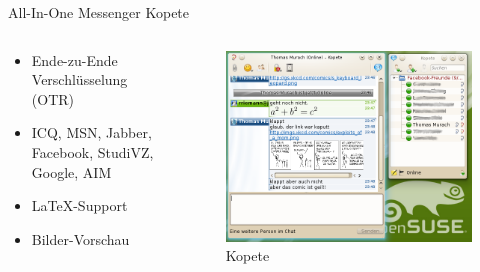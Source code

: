 \begin{frame}{All-In-One Messenger Kopete}
  \begin{columns}
    \begin{column}{0.45\textwidth}
      \begin{itemize}
        \item Ende-zu-Ende Verschlüsselung (OTR)
        \item ICQ, MSN, Jabber, Facebook, StudiVZ, Google, AIM
        \item \LaTeX-Support
        \item Bilder-Vorschau
      \end{itemize}      
    \end{column}
    \begin{column}{0.55\textwidth}
      \begin{figure}
        \includegraphics[bb=0 0 493 382,keepaspectratio=true,width=\textwidth]{kopete}
        \caption{Kopete}
      \end{figure}
    \end{column}
  \end{columns}
\end{frame}

